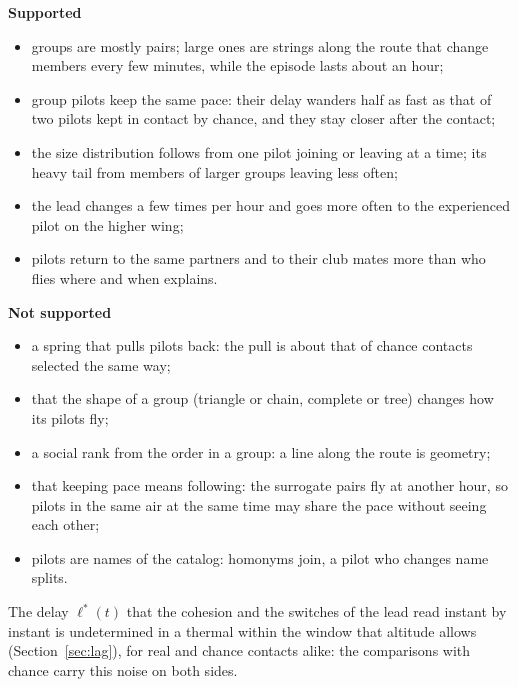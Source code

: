\noindent
\begin{minipage}[t]{0.49\textwidth}
\textbf{Supported}
\begin{itemize}
  \item groups are mostly pairs; large ones are strings along the route that change members every
        few minutes, while the episode lasts about an hour;
  \item group pilots keep the same pace: their delay wanders half as fast as that of two pilots
        kept in contact by chance, and they stay closer after the contact;
  \item the size distribution follows from one pilot joining or leaving at a time; its heavy tail
        from members of larger groups leaving less often;
  \item the lead changes a few times per hour and goes more often to the experienced pilot on the
        higher wing;
  \item pilots return to the same partners and to their club mates more than who flies where and
        when explains.
\end{itemize}
\end{minipage}\hfill
\begin{minipage}[t]{0.49\textwidth}
\textbf{Not supported}
\begin{itemize}
  \item a spring that pulls pilots back: the pull is about that of chance contacts selected the
        same way;
  \item that the shape of a group (triangle or chain, complete or tree) changes how its pilots fly;
  \item a social rank from the order in a group: a line along the route is geometry;
  \item that keeping pace means following: the surrogate pairs fly at another hour, so pilots in
        the same air at the same time may share the pace without seeing each other;
  \item pilots are names of the catalog: homonyms join, a pilot who changes name splits.
\end{itemize}
\end{minipage}

\medskip
The delay $\ell^*(t)$ that the cohesion and the switches of the lead read instant by instant is
undetermined in a thermal within the window that altitude allows (Section~\ref{sec:lag}), for real
and chance contacts alike: the comparisons with chance carry this noise on both sides.
